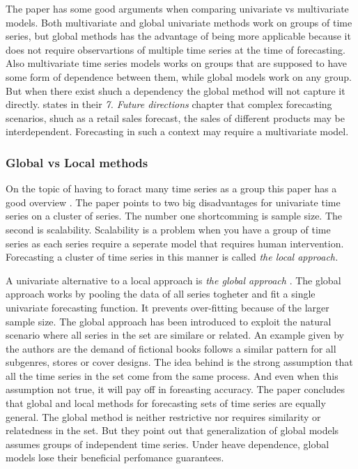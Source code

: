 The paper \cite{Rabanser2020} has some good arguments when comparing univariate vs multivariate models.
Both multivariate and global univariate methods work on groups of time series, but global methods
has the advantage of being more applicable because it does not require observartions of multiple
time series at the time of forecasting.
Also multivariate time series models works on groups that are supposed to have some form of 
dependence between them, while global models work on any group.
But when there exist shuch a dependency the global method will not capture it directly.
\cite{Hewamalage2021} states in their \textit{7. Future directions} chapter that complex
forecasting scenarios, shuch as a retail sales forecast, the sales of different products
may be interdependent.
Forecasting in such a context may require a multivariate model.

\subsubsection{Global vs Local methods}
On the topic of having to foract many time series as a group this paper has a good overview 
\cite{Montero-Manso2021}.
The paper points to two big disadvantages for univariate time series on a cluster of series.
The number one shortcomming is sample size. The second is scalability.
Scalability is a problem when you have a group of time series as each series require a seperate model
that requires human intervention. Forecasting a cluster of time series in this manner is called
\textit{the local approach.}

A univariate alternative to a local approach is \textit{the global approach}
\citep{Rabanser2020}.
The global approach works by pooling the data of all series togheter and fit a single univariate forecasting function. It prevents over-fitting because of the larger sample size.
The global approach has been introduced to exploit the natural scenario where all series
in the set are similare or related. An example given by the authors are the demand of fictional
books follows a similar pattern for all subgenres, stores or cover designs.
The idea behind is the strong assumption that all the time series in the set
come from the same process.
And even when this assumption not true, it will pay off in foreasting accuracy.
The paper \cite{Rabanser2020} concludes that global and local methods for forecasting
sets of time series are equally general. The global method is neither restrictive nor requires
similarity or relatedness in the set.
But they point out that generalization of global models assumes groups of independent time series.
Under heave dependence, global models lose their beneficial perfomance guarantees. 

